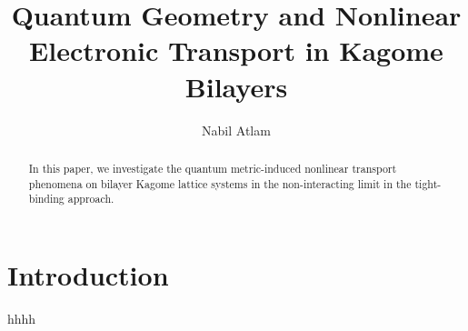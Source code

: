 \documentclass[reprint, prx]{revtex4-2}
\begin{document}
\title{
Quantum Geometry and Nonlinear Electronic Transport in Kagome Bilayers
}
\author{Nabil Atlam}




\begin{abstract}

In this paper, we investigate the quantum metric-induced nonlinear transport phenomena on bilayer Kagome lattice systems in the non-interacting limit in the tight-binding approach. 


\end{abstract}

\maketitle

\section{Introduction}

hhhh




%
\end{document}
